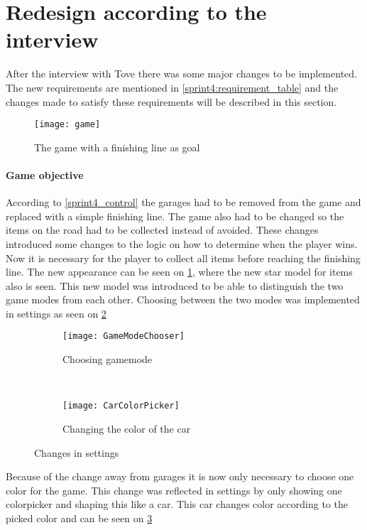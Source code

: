 \section{Redesign according to the interview}
After the interview with Tove there was some major changes to be implemented.
The new requirements are mentioned in \cref{sprint4:requirement_table} and the changes made to satisfy these requirements will be described in this section.

\begin{figure}
\texttt{[image: game]}
\caption{The game with a finishing line as goal}
\label{game_with_finishing_line}
\end{figure}

\paragraph{Game objective}
According to \cref{sprint4_control} the garages had to be removed from the game and replaced with a simple finishing line.
The game also had to be changed so the items on the road had to be collected instead of avoided.
These changes introduced some changes to the logic on how to determine when the player wins.
Now it is necessary for the player to collect all items before reaching the finishing line. 
The new appearance can be seen on \cref{game_with_finishing_line}, where the new star model for items also is seen.
This new model was introduced to be able to distinguish the two game modes from each other.
Choosing between the two modes was implemented in settings as seen on \cref{gamemode}


\begin{figure}
\begin{subfigure}{0.5\textwidth}
\centering
\texttt{[image: GameModeChooser]}
\caption{Choosing gamemode}
\label{gamemode}
\end{subfigure}
~
\begin{subfigure}{0.5\textwidth}
\centering
\texttt{[image: CarColorPicker]}
\caption{Changing the color of the car}
\label{carcolor}
\end{subfigure}
\caption{Changes in settings}
\label{Settings}
\end{figure}

Because of the change away from garages it is now only necessary to choose one color for the game. 
This change was reflected in settings by only showing one colorpicker and shaping this like a car.
This car changes color according to the picked color and can be seen on \cref{carcolor}

